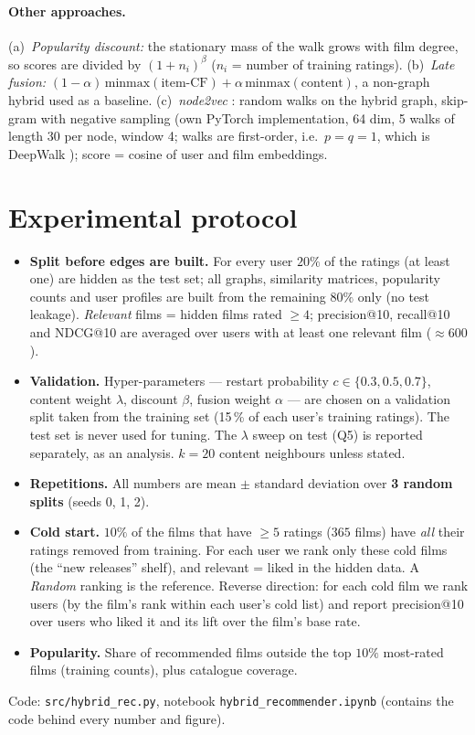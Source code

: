 \documentclass[11pt,a4paper]{article}
\begin{document}
\paragraph{Other approaches.} (a)~\emph{Popularity discount:} the stationary mass of the walk grows with film degree, so scores are divided by $(1+n_i)^{\beta}$ ($n_i$ = number of training ratings). (b)~\emph{Late fusion:} $(1-\alpha)\,\text{minmax}(\text{item-CF})+\alpha\,\text{minmax}(\text{content})$, a non-graph hybrid used as a baseline. (c)~\emph{node2vec} \citep{grover2016}: random walks on the hybrid graph, skip-gram with negative sampling (own PyTorch implementation, 64 dim, 5 walks of length 30 per node, window 4; walks are first-order, i.e.\ $p=q=1$, which is DeepWalk \citep{perozzi2014}); score = cosine of user and film embeddings.

\section{Experimental protocol}
\begin{itemize}\setlength\itemsep{0pt}
\item \textbf{Split before edges are built.} For every user $20\%$ of the ratings (at least one) are hidden as the test set; all graphs, similarity matrices, popularity counts and user profiles are built from the remaining $80\%$ only (no test leakage). \emph{Relevant} films = hidden films rated $\ge4$; precision@10, recall@10 and NDCG@10 are averaged over users with at least one relevant film ($\approx600$).
\item \textbf{Validation.} Hyper-parameters --- restart probability $c\in\{0.3,0.5,0.7\}$, content weight $\lambda$, discount $\beta$, fusion weight $\alpha$ --- are chosen on a validation split taken from the training set (15\,\% of each user's training ratings). The test set is never used for tuning. The $\lambda$ sweep on test (Q5) is reported separately, as an analysis. $k=20$ content neighbours unless stated.
\item \textbf{Repetitions.} All numbers are mean $\pm$ standard deviation over \textbf{3 random splits} (seeds 0, 1, 2).
\item \textbf{Cold start.} $10\%$ of the films that have $\ge5$ ratings ($365$ films) have \emph{all} their ratings removed from training. For each user we rank only these cold films (the ``new releases'' shelf), and relevant = liked in the hidden data. A \emph{Random} ranking is the reference. Reverse direction: for each cold film we rank users (by the film's rank within each user's cold list) and report precision@10 over users who liked it and its lift over the film's base rate.
\item \textbf{Popularity.} Share of recommended films outside the top $10\%$ most-rated films (training counts), plus catalogue coverage.
\end{itemize}
Code: \texttt{src/hybrid\_rec.py}, notebook \texttt{hybrid\_recommender.ipynb} (contains the code behind every number and figure).
\end{document}
